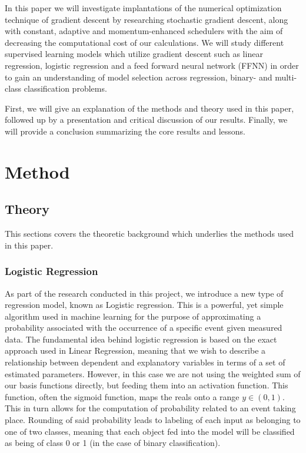 \documentclass[onecolumn,10pt,cleanfoot]{asme2ej}
\begin{document}
In this paper we will investigate implantations of the numerical optimization technique of gradient descent by researching stochastic gradient descent, along with constant, adaptive and momentum-enhanced schedulers with the aim of decreasing the computational cost of our calculations. We will study different supervised learning models which utilize gradient descent such as linear regression, logistic regression and a feed forward neural network (FFNN) in order to gain an understanding of model selection across regression, binary- and multi-class classification problems.

First, we will give an explanation of the methods and theory used in this paper, followed up by a presentation and critical discussion of our results. Finally, we will provide a conclusion summarizing the core results and lessons.

\section{Method}

\subsection{Theory}

This sections covers the theoretic background which underlies the methods used in this paper.

\subsubsection{Logistic Regression}

As part of the research conducted in this project, we introduce a new type of regression model, known as Logistic regression. This is a powerful, yet simple algorithm used in machine learning for the purpose of approximating a probability associated with the occurrence of a specific event given measured data. The fundamental idea behind logistic regression is based on the exact approach used in Linear Regression, meaning that we wish to describe a relationship between dependent and explanatory variables in terms of a set of estimated parameters. However, in this case we are not using the weighted sum of our basis functions directly, but feeding them into an activation function. This function, often the sigmoid function, maps the reals onto a range $y \in (0,1)$. This in turn allows for the computation of probability related to an event taking place. Rounding of said probability leads to labeling of each input as belonging to one of two classes, meaning that each object fed into the model will be classified as being of class 0 or 1 (in the case of binary classification).
\end{document}
